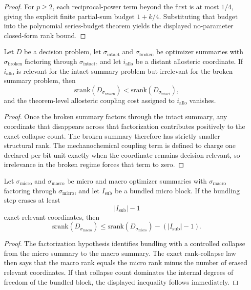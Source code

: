 \begin{proof}
For $p\ge 2$, each reciprocal-power term beyond the first is at most $1/4$, giving the explicit finite partial-sum budget $1+k/4$. Substituting that budget into the polynomial series-budget theorem yields the displayed no-parameter closed-form rank bound.
\end{proof}

\begin{theorem}\label{thm:mechanochemical-coupling-gap}
Let $D$ be a decision problem, let $\sigma_{\mathrm{intact}}$ and $\sigma_{\mathrm{broken}}$ be optimizer summaries with $\sigma_{\mathrm{broken}}$ factoring through $\sigma_{\mathrm{intact}}$, and let $i_{\mathrm{allo}}$ be a distant allosteric coordinate. If $i_{\mathrm{allo}}$ is relevant for the intact summary problem but irrelevant for the broken summary problem, then
\[
\mathrm{srank}(D_{\sigma_{\mathrm{broken}}})
<
\mathrm{srank}(D_{\sigma_{\mathrm{intact}}}),
\]
and the theorem-level allosteric coupling cost assigned to $i_{\mathrm{allo}}$ vanishes.
\end{theorem}

\begin{proof}
Once the broken summary factors through the intact summary, any coordinate that disappears across that factorization contributes positively to the exact collapse count. The broken summary therefore has strictly smaller structural rank. The mechanochemical coupling term is defined to charge one declared per-bit unit exactly when the coordinate remains decision-relevant, so irrelevance in the broken regime forces that term to zero.
\end{proof}

\begin{theorem}\label{thm:hierarchical-srank-bound}
Let $\sigma_{\mathrm{micro}}$ and $\sigma_{\mathrm{macro}}$ be micro and macro optimizer summaries with $\sigma_{\mathrm{macro}}$ factoring through $\sigma_{\mathrm{micro}}$, and let $I_{\mathrm{sub}}$ be a bundled micro block. If the bundling step erases at least
\[
|I_{\mathrm{sub}}|-1
\]
exact relevant coordinates, then
\[
\mathrm{srank}(D_{\sigma_{\mathrm{macro}}})
\le
\mathrm{srank}(D_{\sigma_{\mathrm{micro}}}) - (|I_{\mathrm{sub}}|-1).
\]
\end{theorem}

\begin{proof}
The factorization hypothesis identifies bundling with a controlled collapse from the micro summary to the macro summary. The exact rank-collapse law then says that the macro rank equals the micro rank minus the number of erased relevant coordinates. If that collapse count dominates the internal degrees of freedom of the bundled block, the displayed inequality follows immediately.
\end{proof}

